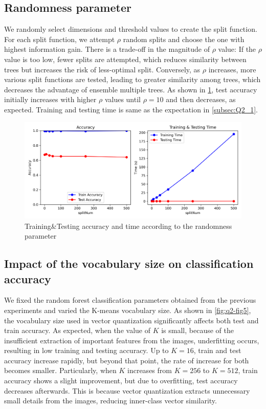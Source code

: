 \subsection{Randomness parameter}
We randomly select dimensions and threshold values to create the split function. For each split function, we attempt $\rho$ random splits and choose the one with highest information gain. There is a trade-off in the magnitude of $\rho$ value: If the $\rho$ value is too low, fewer splits are attempted, which reduces similarity between trees but increases the risk of less-optimal split. Conversely, as $\rho$ increases, more various split functions are tested, leading to greater similarity among trees, which decreases the advantage of ensemble multiple trees. As shown in \cref{fig:q2-fig4}, test accuracy initially increases with higher $\rho$ values until $\rho=10$ and then decreases, as expected. Training and testing time is same as the expectation in \cref{subsec:Q2_1}.

\begin{figure}
	\centering
	\includegraphics[width=0.55\linewidth]{image/q2-fig4.png}
	\caption{Training\&Testing accuracy and time according to the randomness parameter}
	\label{fig:q2-fig4}
\end{figure}

\subsection{Impact of the vocabulary size on classification accuracy}
We fixed the random forest classification parameters obtained from the previous experiments and varied the K-means vocabulary size. As shown in \cref{fig:q2-fig5}, the vocabulary size used in vector quantization significantly affects both test and train accuracy. As expected, when the value of $K$ is small, because of the insufficient extraction of important features from the images, underfitting occurs, resulting in low training and testing accuracy. Up to $K=16$, train and test accuracy increase rapidly, but beyond that point, the rate of increase for both becomes smaller. Particularly, when $K$ increases from $K=256$ to $K=512$, train accuracy shows a slight improvement, but due to overfitting, test accuracy decreases afterwards. This is because vector quantization extracts unnecessary small details from the images, reducing inner-class vector similarity.

